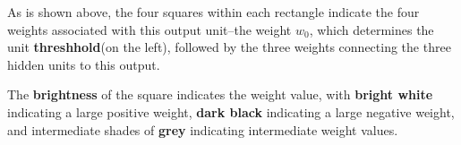 As is shown above, the four squares within each rectangle indicate the four weights associated with this output unit--the weight $w_0$, which determines the unit \textbf{threshhold}(on the left), followed by the three weights connecting the three hidden units to this output.

The \textbf{brightness} of the square indicates the weight value, with \textbf{bright white} indicating a large positive weight, \textbf{dark black} indicating a large negative weight, and intermediate shades of \textbf{grey} indicating intermediate weight values.



